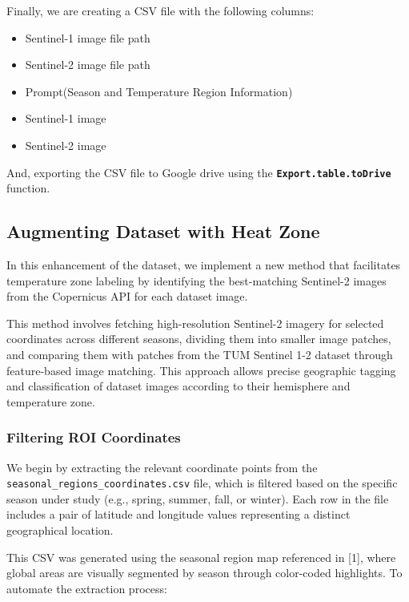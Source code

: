 Finally, we are creating a CSV file with the following columns:
\begin{itemize}
    \item Sentinel-1 image file path
    \item Sentinel-2 image file path
    \item Prompt(Season and Temperature Region Information)
    \item Sentinel-1 image
    \item Sentinel-2 image
\end{itemize}
And, exporting the CSV file to Google drive using the \textbf{\texttt{Export.table.toDrive}} function.


\subsection{Augmenting Dataset with Heat Zone}
In this enhancement of the dataset, we implement a new method that facilitates temperature zone labeling by identifying the best-matching Sentinel-2 images from the Copernicus API for each dataset image.

This method involves fetching high-resolution Sentinel-2 imagery for selected coordinates across different seasons, dividing them into smaller image patches, and comparing them with patches from the TUM Sentinel 1-2 dataset through feature-based image matching. This approach allows precise geographic tagging and classification of dataset images according to their hemisphere and temperature zone.

\subsubsection{Filtering ROI Coordinates}

We begin by extracting the relevant coordinate points from the \texttt{seasonal\_regions\_coordinates.csv} file, which is filtered based on the specific season under study (e.g., spring, summer, fall, or winter). Each row in the file includes a pair of latitude and longitude values representing a distinct geographical location.

This CSV was generated using the seasonal region map referenced in [1], where global areas are visually segmented by season through color-coded highlights. To automate the extraction process:

